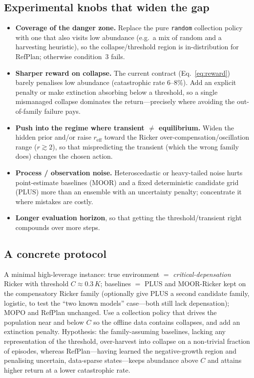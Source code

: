 \documentclass[11pt]{article}
\newcommand{\reff}{r_{\mathrm{eff}}}
\begin{document}
\subsection{Experimental knobs that widen the gap}
\begin{itemize}
  \item \textbf{Coverage of the danger zone.} Replace the pure \texttt{random}
  collection policy with one that also visits low abundance (e.g.\ a mix of random
  and a harvesting heuristic), so the collapse/threshold region is in-distribution
  for RefPlan; otherwise condition~3 fails.
  \item \textbf{Sharper reward on collapse.} The current contract
  (Eq.~\ref{eq:reward}) barely penalises low abundance (catastrophic rate
  $6$--$8\%$). Add an explicit penalty or make extinction absorbing below a
  threshold, so a single mismanaged collapse dominates the return---precisely where
  avoiding the out-of-family failure pays.
  \item \textbf{Push into the regime where transient $\neq$ equilibrium.} Widen the
  hidden prior and/or raise $\reff$ toward the Ricker over-compensation/oscillation
  range ($r \gtrsim 2$), so that mispredicting the transient (which the wrong family
  does) changes the chosen action.
  \item \textbf{Process / observation noise.} Heteroscedastic or heavy-tailed noise
  hurts point-estimate baselines (MOOR) and a fixed deterministic candidate grid
  (PLUS) more than an ensemble with an uncertainty penalty; concentrate it where
  mistakes are costly.
  \item \textbf{Longer evaluation horizon}, so that getting the threshold/transient
  right compounds over more steps.
\end{itemize}

\subsection{A concrete protocol}
A minimal high-leverage instance: true environment $=$ \emph{critical-depensation}
Ricker with threshold $C \approx 0.3\,K$; baselines $=$ PLUS and MOOR-Ricker kept on
the compensatory Ricker family (optionally give PLUS a second candidate family,
logistic, to test the ``two known models'' case---both still lack depensation);
MOPO and RefPlan unchanged. Use a collection policy that drives the population near
and below $C$ so the offline data contains collapses, and add an extinction
penalty. Hypothesis: the family-assuming baselines, lacking any representation of
the threshold, over-harvest into collapse on a non-trivial fraction of episodes,
whereas RefPlan---having learned the negative-growth region and penalising
uncertain, data-sparse states---keeps abundance above $C$ and attains higher return
at a lower catastrophic rate.
\end{document}
